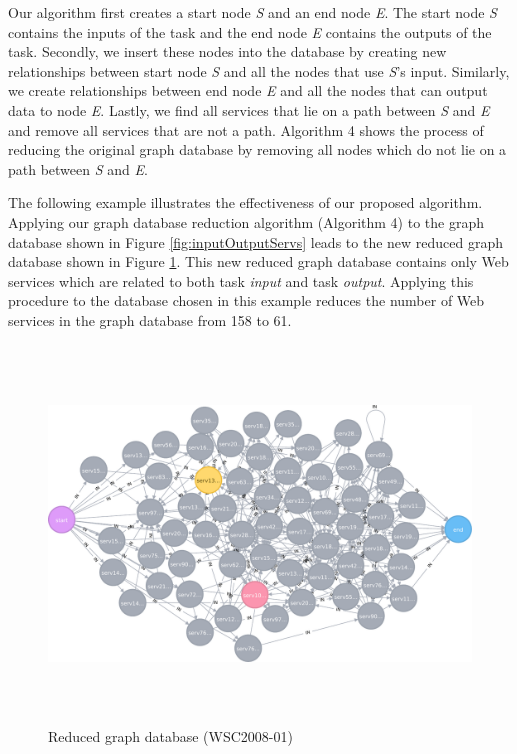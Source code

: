 \par

Our algorithm first creates a start node \emph{S} and an end node \emph{E}. The start node \emph{S} contains the inputs of the task and the end node \emph{E}  contains the outputs of the task. Secondly, we insert these nodes into the database by creating new relationships between start node \emph{S} and all the nodes that use \emph{S}'s input. Similarly, we create relationships between end node \emph{E} and all the nodes that can output data to node \emph{E}. Lastly, we find all services that lie on a path between \emph{S} and \emph{E} and remove all services that are not a path. Algorithm 4 shows the process of reducing the original graph database by removing all nodes which do not lie on a path between \emph{S} and \emph{E}.


The following example illustrates the effectiveness of our proposed algorithm. Applying our graph database reduction algorithm (Algorithm 4) to the graph database shown in Figure \ref{fig:inputOutputServs} leads to the new reduced graph database shown in Figure \ref{fig:reduced}. This new reduced graph database contains only Web services which are related to both task \emph{input} and task \emph{output}. Applying this procedure to the database chosen in this example reduces the number of Web services in the graph database from 158 to 61.

\begin{figure}[h]
\includegraphics[width = 13cm, height = 10cm, scale = 0.5]{svg-reduced.pdf}
\centering
\caption{Reduced graph database (WSC2008-01)}
\label{fig:reduced} 
\end{figure} 

